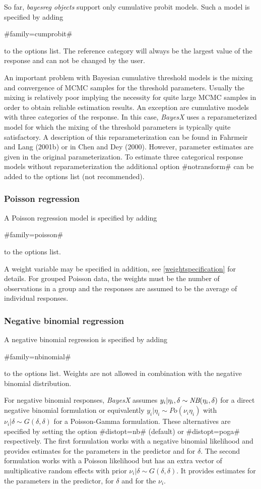 So far, {\em bayesreg objects} support only cumulative probit
models. Such a model is specified by adding

#family=cumprobit#

to the options list. The reference category will always be the
largest value of the response and can not be changed by the user.

An important problem with Bayesian cumulative threshold models is
the mixing and convergence of MCMC samples for the threshold
parameters. Usually the mixing is relatively poor implying the
necessity for quite large MCMC samples in order to obtain reliable
estimation results. An exception are cumulative models with three
categories of the response. In this case, {\em BayesX} uses a
reparameterized model for which the mixing of the threshold
parameters is typically quite satisfactory. A description of this
reparameterization can be found in Fahrmeir and Lang (2001b) or in
Chen and Dey (2000). However, parameter estimates are given in the
original parameterization. To estimate three categorical response
models without reparameterization the additional option
#notransform# can be added to the options list (not recommended).

\subsubsection*{Poisson regression}

A Poisson regression model is specified by adding

#family=poisson#

to the options list.

A weight variable may be specified in addition, see
\autoref{weightspecification} for details. For grouped Poisson
data, the weights must be the number of observations in a group
and the responses are assumed to be the average of individual
responses.

\subsubsection*{Negative binomial regression}

A negative binomial regression is specified by adding

#family=nbinomial#

to the options list. Weights are not allowed in combination with
the negative binomial distribution.

For negative binomial responses, {\em BayesX} assumes $y_i |
\eta_i,\delta \sim \mbox{\it NB}(\eta_i,\delta)$ for a direct
negative binomial formulation or equivalently $y_i | \eta_i \sim
Po(\nu_i \eta_i)$ with $\nu_i|\delta \sim G(\delta, \delta)$ for a
Poisson-Gamma formulation. These alternatives are specified by
setting the option #distopt=nb# (default) or #distopt=poga#
respectively. The first formulation works with a negative binomial
likelihood and provides estimates for the parameters in the
predictor and for $\delta$. The second formulation works with a
Poisson likelihood but has an extra vector of multiplicative
random effects with prior $\nu_i|\delta \sim G(\delta, \delta)$.
It provides estimates for the parameters in the predictor, for
$\delta$ and for the $\nu_i$.

